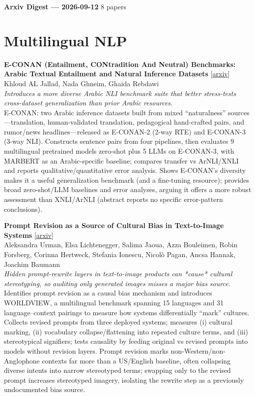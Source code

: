 \documentclass[12pt,letterpaper]{article}
\begin{document}
{\footnotesize\textbf{Arxiv Digest --- 2026-09-12} \hfill 8 papers}

\smallskip

\section*{Multilingual NLP}

{\small\textbf{E-CONAN (Entailment, CONtradition And Neutral) Benchmarks: Arabic Textual Entailment and Natural Inference Datasets}} {\scriptsize[\href{https://arxiv.org/abs/2609.11334}{arxiv}]}\\
{\scriptsize Khloud AL Jallad, Nada Ghneim, Ghaida Rebdawi}\\

{\small\textit{Introduces a more diverse Arabic NLI benchmark suite that better stress-tests cross-dataset generalization than prior Arabic resources.}}\\[1pt]
{\footnotesize E-CONAN: two Arabic inference datasets built from mixed ``naturalness'' sources---translation, human-validated translation, pedagogical hand-crafted pairs, and rumor/news headlines---released as E-CONAN-2 (2-way RTE) and E-CONAN-3 (3-way NLI). Constructs sentence pairs from four pipelines, then evaluates 9 multilingual pretrained models zero-shot plus 5 LLMs on E-CONAN-3, with MARBERT as an Arabic-specific baseline; compares transfer vs ArNLI/XNLI and reports qualitative/quantitative error analysis. Shows E-CONAN's diversity makes it a useful generalization benchmark (and a fine-tuning resource); provides broad zero-shot/LLM baselines and error analyses, arguing it offers a more robust assessment than XNLI/ArNLI (abstract reports no specific error-pattern conclusions).}

\medskip

{\small\textbf{Prompt Revision as a Source of Cultural Bias in Text-to-Image Systems}} {\scriptsize[\href{https://arxiv.org/abs/2609.11532}{arxiv}]}\\
{\scriptsize Aleksandra Urman, Elsa Lichtenegger, Salima Jaoua, Azza Bouleimen, Robin Forsberg, Corinna Hertweck, Stefania Ionescu, Nicol\`o Pagan, Ancsa Hannak, Joachim Baumann}\\

{\small\textit{Hidden prompt-rewrite layers in text-to-image products can *cause* cultural stereotyping, so auditing only generated images misses a major bias source.}}\\[1pt]
{\footnotesize Identifies prompt revision as a causal bias mechanism and introduces WORLDVIEW, a multilingual benchmark spanning 15 languages and 31 language--context pairings to measure how systems differentially ``mark'' cultures. Collects revised prompts from three deployed systems; measures (i) cultural marking, (ii) vocabulary collapse/flattening into repeated culture terms, and (iii) stereotypical signifiers; tests causality by feeding original vs revised prompts into models without revision layers. Prompt revision marks non-Western/non-Anglophone contexts far more than a US/English baseline, often collapsing diverse intents into narrow stereotyped terms; swapping only to the revised prompt increases stereotyped imagery, isolating the rewrite step as a previously undocumented bias source.}
\end{document}
